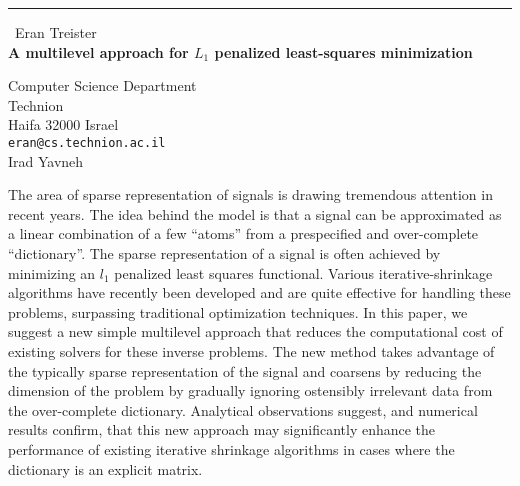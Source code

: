 \documentclass{report}
\begin{document}
\begin{center}
\rule{6in}{1pt} \
{\large Eran Treister \\
{\bf A multilevel approach for $\textit{L}_1$ penalized least-squares minimization}}

Computer Science Department \\ Technion \\ Haifa 32000 Israel
\\
{\tt eran@cs.technion.ac.il}\\
Irad Yavneh\end{center}

The area of sparse representation of signals is drawing tremendous
attention in recent years. The idea behind the model is that a
signal can be approximated as a linear combination of a few
``atoms'' from a prespecified and over-complete ``dictionary''.
The sparse representation of a signal is often achieved by
minimizing an $l_1$ penalized least squares functional. Various
iterative-shrinkage algorithms have recently been developed and
are quite effective for handling these problems, surpassing
traditional optimization techniques. In this paper, we suggest a
new simple multilevel approach that reduces the computational cost
of existing solvers for these inverse problems. The new method
takes advantage of the typically sparse representation of the
signal and coarsens by reducing the dimension of the problem by
gradually ignoring ostensibly irrelevant data from the
over-complete dictionary. Analytical observations suggest, and
numerical results confirm, that this new approach may
significantly enhance the performance of existing iterative
shrinkage algorithms in cases where the dictionary is an explicit
matrix.
\end{document}
